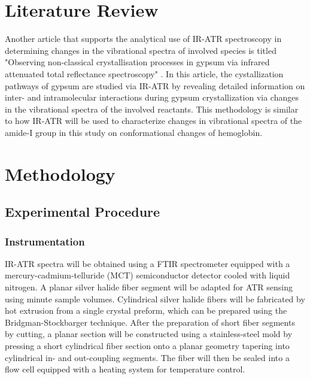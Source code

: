 \documentclass{article}
\begin{document}
\section*{Literature Review}
Another article that supports the analytical use of IR-ATR
spectroscopy\cite{lab_man} in determining changes in the vibrational spectra of
involved species is titled "Observing non-classical crystallisation processes in
gypsum via infrared attenuated total reflectance spectroscopy" \cite{gypsum}.
In this article, the cystallization pathways of gypsum are studied via IR-ATR by
revealing detailed information on inter- and intramolecular interactions during
gypsum crystallization via changes in the vibrational spectra of the involved
reactants. This methodology is similar to how IR-ATR will be used to
characterize changes in vibrational spectra of the amide-I group in this study
on conformational changes of hemoglobin.

\section*{Methodology}
\subsection*{Experimental Procedure}
\subsubsection*{Instrumentation}
IR-ATR spectra will be obtained using a FTIR spectrometer equipped with a
mercury-cadmium-telluride (MCT) semiconductor detector cooled with liquid
nitrogen. A planar silver halide fiber segment will be adapted for ATR sensing
using minute sample volumes. Cylindrical silver halide fibers will be fabricated
by hot extrusion from a single crystal preform, which can be prepared using the
Bridgman-Stockbarger technique. After the preparation of short fiber segments by
cutting, a planar section will be constructed using a stainless-steel mold by
pressing a short cylindrical fiber section onto a planar geometry tapering into
cylindrical in- and out-coupling segments. 
The fiber will then be sealed into a flow cell equipped with a heating system
for temperature control.
\end{document}
